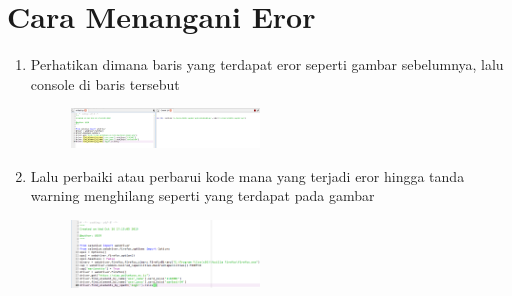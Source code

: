 \chapter*{Cara Menangani Eror}

\begin{enumerate}
	\item Perhatikan dimana baris yang terdapat eror seperti gambar sebelumnya, lalu console di baris tersebut 
	\begin{figure} [h]
	\includegraphics[width=5cm]{identasi/2.png}
	\centering
	\end{figure}


	
	\item Lalu perbaiki atau perbarui kode mana yang terjadi eror hingga tanda warning menghilang seperti yang terdapat pada gambar 
	\begin{figure} [h]
	\includegraphics[width=5cm]{identasi/identasi.png}
	\centering
	\end{figure}
\end{enumerate}